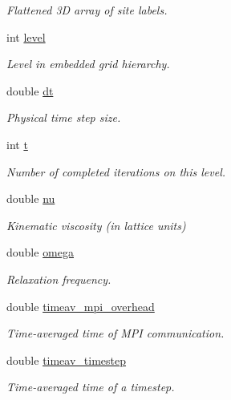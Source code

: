 \begin{DoxyCompactItemize}
\begin{DoxyCompactList}\small\item\em Flattened 3D array of site labels. \end{DoxyCompactList}\item 
int \hyperlink{class_grid_obj_a7dfedc4442a386ec15c8b03ca899c1a9}{level}
\begin{DoxyCompactList}\small\item\em Level in embedded grid hierarchy. \end{DoxyCompactList}\item 
double \hyperlink{class_grid_obj_afd504b39f12eb0a237bc6313de94e094}{dt}
\begin{DoxyCompactList}\small\item\em Physical time step size. \end{DoxyCompactList}\item 
int \hyperlink{class_grid_obj_a783b18a053e244ae7b7b436ab21c0592}{t}
\begin{DoxyCompactList}\small\item\em Number of completed iterations on this level. \end{DoxyCompactList}\item 
double \hyperlink{class_grid_obj_a755f85eb5480d959211e00937a478ae9}{nu}
\begin{DoxyCompactList}\small\item\em Kinematic viscosity (in lattice units) \end{DoxyCompactList}\item 
double \hyperlink{class_grid_obj_a21461e5d39c5ae83ae42170c829e9da3}{omega}
\begin{DoxyCompactList}\small\item\em Relaxation frequency. \end{DoxyCompactList}\item 
double \hyperlink{class_grid_obj_a147cfb80b653ca4432432e8185cf38ef}{timeav\+\_\+mpi\+\_\+overhead}
\begin{DoxyCompactList}\small\item\em Time-\/averaged time of M\+PI communication. \end{DoxyCompactList}\item 
double \hyperlink{class_grid_obj_a2ad670e6b9bdd28b5060397800170310}{timeav\+\_\+timestep}
\begin{DoxyCompactList}\small\item\em Time-\/averaged time of a timestep. \end{DoxyCompactList}\item 

\end{DoxyCompactItemize}
